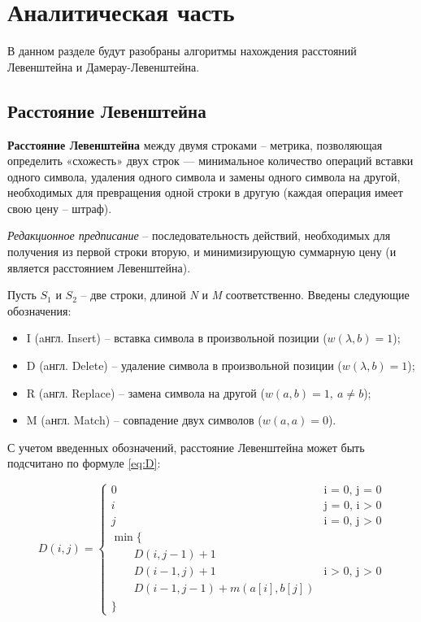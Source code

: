 \chapter{Аналитическая часть}

В данном разделе будут разобраны алгоритмы нахождения расстояний Левенштейна и Дамерау-Левенштейна.

\section{Расстояние Левенштейна}

\textbf{Расстояние Левенштейна} \cite{levenshtein} между двумя строками -- метрика, позволяющая определить «схожесть» двух строк — минимальное количество операций вставки одного символа, удаления одного символа и замены одного символа на другой, необходимых для превращения одной строки в другую (каждая операция имеет свою цену -- штраф). \newline


\textit{Редакционное предписание} -- последовательность действий, необходимых для получения из первой строки вторую, и минимизирующую суммарную цену (и является расстоянием Левенштейна).\newline


Пусть $S_{1}$ и $S_{2}$ -- две строки, длиной \textit{N} и \textit{M} соответственно. 
Введены следующие обозначения:
\begin{itemize}
        \item I (aнгл. Insert) -- вставка символа в произвольной позиции ($w(\lambda,b)=1$);
        \item D (aнгл. Delete) -- удаление символа в произвольной позиции ($w(\lambda,b)=1$);
        \item R (aнгл. Replace) -- замена символа на другой ($w(a,b)=1, \medspace a \neq b$);
        \item M (aнгл. Match) -- совпадение двух символов ($w(a,a)=0$). \newline
\end{itemize}


С учетом введенных обозначений, расстояние Левенштейна может быть подсчитано по формуле \ref{eq:D}:


\begin{equation}
	\label{eq:D}
	D(i, j) = \begin{cases}

		0 &\text{i = 0, j = 0}\\
		i &\text{j = 0, i > 0}\\
		j &\text{i = 0, j > 0}\\
		\min \lbrace \\
		\qquad D(i, j-1) + 1\\
		\qquad D(i-1, j) + 1 &\text{i > 0, j > 0}\\
		\qquad D(i-1, j-1) + m(a[i], b[j]) \\
		\rbrace
	\end{cases}
\end{equation}


